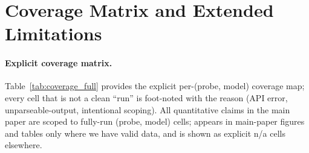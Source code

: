 \section{Coverage Matrix and Extended Limitations}
\label{app:cov}

\paragraph{Explicit coverage matrix.}
Table~\ref{tab:coverage_full} provides the explicit per-(probe, model)
coverage map; every cell that is not a clean ``run'' is foot-noted with the
reason (API error, unparseable-output, intentional scoping). All quantitative
claims in the main paper are scoped to fully-run (probe, model) cells;
\omini{} appears in main-paper figures and tables only where we have valid
data, and is shown as explicit n/a cells elsewhere.




